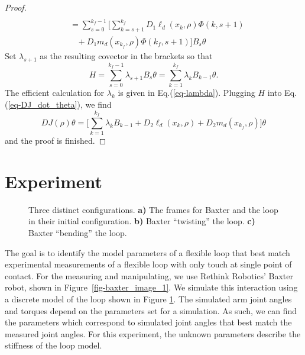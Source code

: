 \documentclass[letterpaper, 10pt, conference]{ieeeconf}
\begin{document}
\begin{proof}
\[\begin{array}{l}
\\\hspace{10pt} = \sum_{s=0}^{k_f-1}\Big[\sum_{k = s+1}^{k_f}D_1\ell_d(x_k,\rho) \Phi(k,s+1) \\\hspace{20pt}+ D_1m_d(x_{k_f},\rho)\Phi(k_f,s+1)\Big]B_s\theta
\end{array}
\]
Set $\lambda_{s+1}$ as the resulting covector in the brackets so that 
\[
H = \sum_{s=0}^{k_f-1} \lambda_{s+1} B_s\theta = \sum_{k=1}^{k_f} \lambda_{k} B_{k-1}\theta.
\]
The efficient calculation for $\lambda_k$ is given in Eq.(\ref{eq-lambda}).  Plugging $H$ into Eq.(\ref{eq-DJ_dot_theta}), we find
\[
DJ(\rho)\theta = \Big[\sum_{k = 1}^{k_f}\lambda_kB_{k-1} +D_2\ell_d(x_k,\rho) + D_2m_d(x_{k_f},\rho)\Big]\theta
\]
and the proof is finished.
\end{proof}

\section{Experiment}
\label{sec-experiment}


\begin{figure}
\centering
\def\svgwidth{.97\textwidth}

\caption{Three distinct configurations.  \textbf{a)} The frames for Baxter and the loop in their initial configuration. \textbf{b)} Baxter ``twisting'' the loop. \textbf{c)} Baxter ``bending'' the loop.}
\label{fig-3bloops}
\end{figure}


The goal is to identify the model parameters of a flexible loop that best match experimental measurements of a flexible loop with only touch at single point of contact.  For the measuring and manipulating, we use Rethink Robotics' Baxter robot, shown in Figure~\ref{fig-baxter_image_1}. We simulate this interaction using a discrete model of the loop shown in Figure \ref{fig-3bloops}. The simulated arm joint angles and torques depend on the parameters set for a simulation.  As such, we can find the parameters which correspond to simulated joint angles that best match the measured joint angles.  For this experiment, the unknown parameters describe the stiffness of the loop model.
\end{document}
